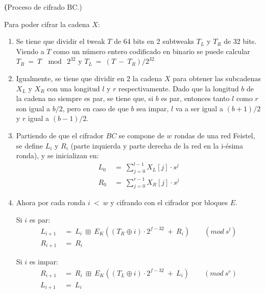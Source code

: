 
\textbf(Proceso de cifrado BC.)

Para poder cifrar la cadena $X$:

\begin{enumerate}

  \item Se tiene que dividir el tweak $T$ de 64 bits en 2 subtweaks $T_L$ y
    $T_R$ de 32 bits. Viendo a $T$ como un número entero codificado en binario
    se puede calcular $T_R\: =\: T\: \mod\: 2^{32}$ y
    $T_L\: =\: (T\: -\: T_R) / 2^{32}$

  \item Igualmente, se tiene que dividir en 2 la cadena $X$ para obtener las
    subcadenas $X_L$ y $X_R$ con una longitud $l$ y $r$ respectivamente.
    Dado que la longitud $b$ de la cadena no siempre es par, se tiene que, si
    $b$ es par, entonces tanto $l$ como $r$ son igual a $b/2$, pero en caso
    de que $b$ sea impar, $l$ va a ser igual a $(b+1)/2$ y $r$ igual a
    $(b-1)/2$.

  \item Partiendo de que el cifrador $BC$ se compone de $w$ rondas de una red
    Feistel, se define $L_i$ y $R_i$ (parte izquierda y parte derecha de la
    red en la i-ésima ronda), y se inicializan en:
    \begin{align}
      L_0\: &=\: \sum_{j=0}^{l-1} X_L[j] \cdot s^j \\
      R_0\: &=\: \sum_{j=0}^{r-1} X_R[j] \cdot s^j
    \end{align}

  \item Ahora por cada ronda $i\: <\: w$ y cifrando con el cifrador por
    bloques $E$.

    Si $i$ es par:
    \begin{align}
      L_{i+1}\: &=\: L_i\: \boxplus\:
                    E_K((T_R \oplus i) \cdot 2^{f-32}\: +\: R_i)\qquad
                    (mod\ s^l) \\
      R_{i+1}\: &=\: R_i
    \end{align}

    Si $i$ es impar:
    \begin{align}
      R_{i+1}\: &=\: R_i\: \boxplus\:
                    E_K((T_L \oplus i) \cdot 2^{f-32}\: +\: L_i)\qquad
                    (mod\ s^r) \\
      L_{i+1}\: &=\: L_i
    \end{align}


\end{enumerate}
